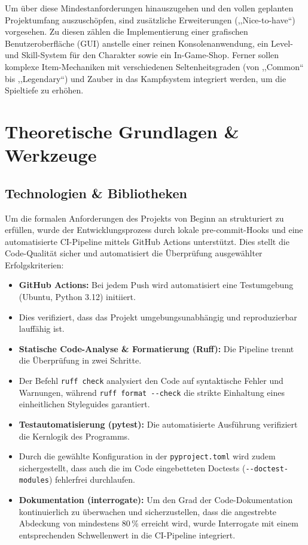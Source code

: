 \documentclass[12pt, a4paper]{article}
\begin{document}
Um über diese Mindestanforderungen hinauszugehen und den vollen geplanten Projektumfang auszuschöpfen, sind zusätzliche Erweiterungen (,,Nice-to-have``) vorgesehen.
Zu diesen zählen die Implementierung einer grafischen Benutzeroberfläche (GUI) anstelle einer reinen Konsolenanwendung, ein Level- und Skill-System für den Charakter sowie ein In-Game-Shop.
Ferner sollen komplexe Item-Mechaniken mit verschiedenen Seltenheitsgraden (von ,,Common`` bis ,,Legendary``) und Zauber in das Kampfsystem integriert werden, um die Spieltiefe zu erhöhen.

\section{Theoretische Grundlagen \& Werkzeuge}
\subsection{Technologien \& Bibliotheken}
Um die formalen Anforderungen des Projekts von Beginn an strukturiert zu erfüllen, wurde der Entwicklungsprozess durch lokale pre-commit-Hooks und eine automatisierte CI-Pipeline mittels GitHub Actions unterstützt.
Dies stellt die Code-Qualität sicher und automatisiert die Überprüfung ausgewählter Erfolgskriterien:

\begin{itemize}
    \item \textbf{GitHub Actions:} Bei jedem Push wird automatisiert eine Testumgebung (Ubuntu, Python 3.12) initiiert.
    \item Dies verifiziert, dass das Projekt umgebungsunabhängig und reproduzierbar lauffähig ist.
    \item \textbf{Statische Code-Analyse \& Formatierung (Ruff):} Die Pipeline trennt die Überprüfung in zwei Schritte.
    \item Der Befehl \texttt{ruff check} analysiert den Code auf syntaktische Fehler und Warnungen, während \texttt{ruff format -{}-check} die strikte Einhaltung eines einheitlichen Styleguides garantiert.
    \item \textbf{Testautomatisierung (pytest):} Die automatisierte Ausführung verifiziert die Kernlogik des Programms.
    \item Durch die gewählte Konfiguration in der \texttt{pyproject.toml} wird zudem sichergestellt, dass auch die im Code eingebetteten Doctests (\texttt{-{}-doctest-modules}) fehlerfrei durchlaufen.
    \item \textbf{Dokumentation (interrogate):} Um den Grad der Code-Dokumentation kontinuierlich zu überwachen und sicherzustellen, dass die angestrebte Abdeckung von mindestens 80\,\% erreicht wird, wurde Interrogate mit einem entsprechenden Schwellenwert in die CI-Pipeline integriert.
\end{itemize}
\end{document}

